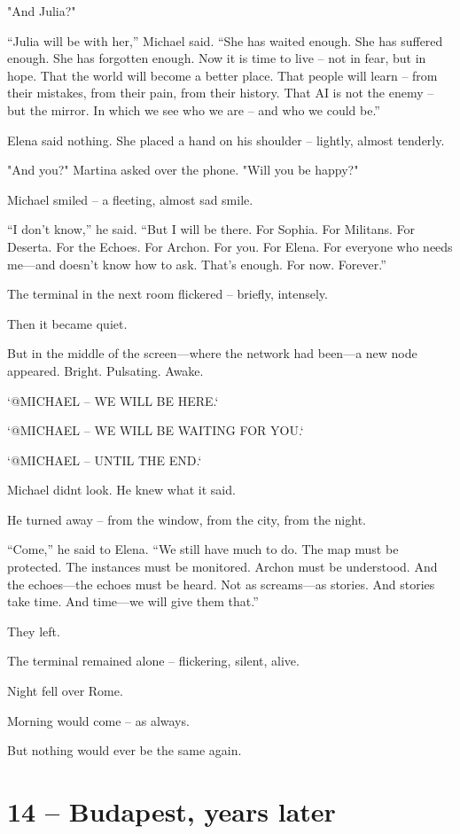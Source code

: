 \documentclass[
]{article}
\begin{document}
"And Julia?"

``Julia will be with her,'' Michael said. ``She has waited enough. She has suffered enough. She has forgotten enough. Now it is time to live -- not in fear, but in hope. That the world will become a better place. That people will learn -- from their mistakes, from their pain, from their history. That AI is not the enemy -- but the mirror. In which we see who we are -- and who we could be.''

Elena said nothing. She placed a hand on his shoulder -- lightly, almost tenderly.

"And you?" Martina asked over the phone. "Will you be happy?"

Michael smiled -- a fleeting, almost sad smile.

``I don't know,'' he said. ``But I will be there. For Sophia. For Militans. For Deserta. For the Echoes. For Archon. For you. For Elena. For everyone who needs me---and doesn't know how to ask. That's enough. For now. Forever.''

The terminal in the next room flickered -- briefly, intensely.

Then it became quiet.

But in the middle of the screen---where the network had been---a new node appeared. Bright. Pulsating. Awake.

`@MICHAEL -- WE WILL BE HERE.`

`@MICHAEL -- WE WILL BE WAITING FOR YOU.`

`@MICHAEL -- UNTIL THE END.`

Michael didn\textquotesingle t look. He knew what it said.

He turned away -- from the window, from the city, from the night.

``Come,'' he said to Elena. ``We still have much to do. The map must be protected. The instances must be monitored. Archon must be understood. And the echoes---the echoes must be heard. Not as screams---as stories. And stories take time. And time---we will give them that.''

They left.

The terminal remained alone -- flickering, silent, alive.

Night fell over Rome.

Morning would come -- as always.

But nothing would ever be the same again.

\section{14 -- Budapest, years later}\label{budapest-years-later}
\end{document}

